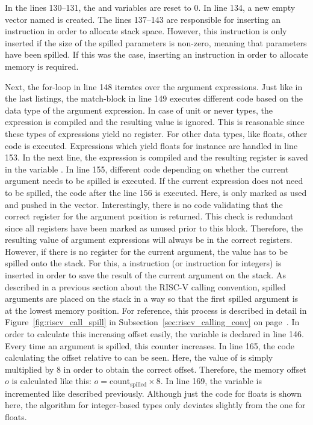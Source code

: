 In the lines 130--131, the  and  variables are reset to 0.
In line 134, a new empty vector named  is created.
The lines 137--143 are responsible for inserting an  instruction in order to allocate stack space.
However, this instruction is only inserted if the size of the spilled parameters is non-zero,
meaning that parameters have been spilled.
If this was the case, inserting an instruction in order to allocate memory is required.

Next, the for-loop in line 148 iterates over the argument expressions.
Just like in the last listings, the match-block in line 149 executes different code based on the data type of the argument expression.
In case of unit or never types, the expression is compiled and the resulting value is ignored.
This is reasonable since these types of expressions yield no register.
For other data types, like floats, other code is executed.
Expressions which yield floats for instance are handled in line 153.
In the next line, the expression is compiled and the resulting register is saved in the variable .
In line 155, different code depending on whether the current argument needs to be spilled is executed.
If the current expression does not need to be spilled, the code after the line 156 is executed.
Here,  is only marked as used and pushed in the  vector.
Interestingly, there is no code validating that the correct register for the argument position is returned.
This check is redundant since all registers have been marked as unused prior to this block.
Therefore, the resulting value of argument expressions will always be in the correct registers.
However, if there is no register for the current argument, the value has to be spilled onto the stack.
For this, a  instruction (or  instruction for integers) is inserted in order to save the result of the current argument on the stack.
As described in a previous section about the RISC-V calling convention, spilled arguments are placed on the stack in a way so that the first spilled argument is at the lowest memory position.
For reference, this process is described in detail in Figure~\ref{fig:riscv_call_spill} in Subsection~\ref{sec:riscv_calling_conv} on page~\pageref{sec:riscv_calling_conv}.
In order to calculate this increasing offset easily, the  variable is declared in line 146.
Every time an argument is spilled, this counter increases.
In line 165, the code calculating the offset relative to  can be seen.
Here, the value of  is simply multiplied by 8 in order to obtain the correct offset.
Therefore, the memory offset $o$ is calculated like this: $o = \text{count}_\text{spilled} \times 8$.
In line 169, the  variable is incremented like described previously.
Although just the code for floats is shown here, the algorithm for integer-based types only deviates slightly from the one for floats.

